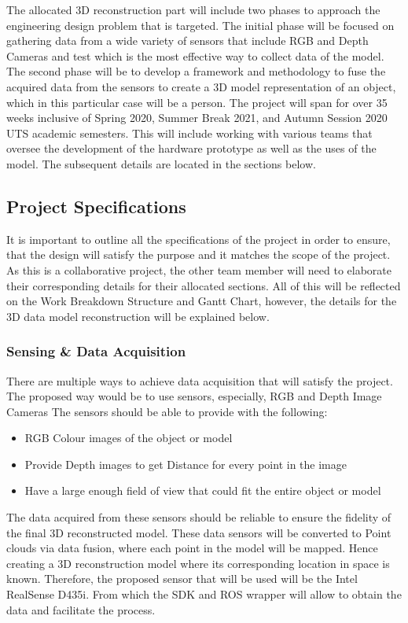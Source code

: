 \documentclass[12pt]{report}
\begin{document}
The allocated 3D reconstruction part will include two phases to approach the engineering design problem that is targeted. 
The initial phase will be focused on gathering data from a wide variety of sensors that include RGB and Depth Cameras and test which is the most effective way to collect data of the model. 
The second phase will be to develop a framework and methodology to fuse the acquired data from the sensors to create a 3D model representation of an object, which in this particular case will be a person. 
The project will span for over 35 weeks inclusive of Spring 2020, Summer Break 2021, and Autumn Session 2020 UTS academic semesters. This will include working with various teams that oversee the development of the hardware prototype as well as the uses of the model. The subsequent details are located in the sections below. 

\subsection{Project Specifications}
It is important to outline all the specifications of the project in order to ensure, that the design will satisfy the purpose and it matches the scope of the project. As this is a collaborative project, the other team member will need to elaborate their corresponding details for their allocated sections. 
All of this will be reflected on the Work Breakdown Structure and Gantt Chart, however, the details for the 3D data model reconstruction will be explained below.  

\subsubsection{Sensing \& Data Acquisition}
There are multiple ways to achieve data acquisition that will satisfy the project. The proposed way would be to use sensors, especially, RGB and Depth Image Cameras
The sensors should be able to provide with the following:
\begin{itemize}
  \item RGB  Colour images of the object or model
  \item Provide Depth images  to get Distance for every point in the image
  \item Have a large enough field of view that could fit the entire object or model
\end{itemize}
The data acquired from these sensors should be reliable to ensure the fidelity of the final 3D reconstructed model. These data sensors will be converted to Point clouds via data fusion, where each point in the model will be mapped. Hence creating a 3D reconstruction model where its corresponding location in space is known. 
Therefore, the proposed sensor that will be used will be the Intel RealSense D435i. From which the SDK and ROS wrapper will allow to obtain the data and facilitate the process. 
\end{document}
